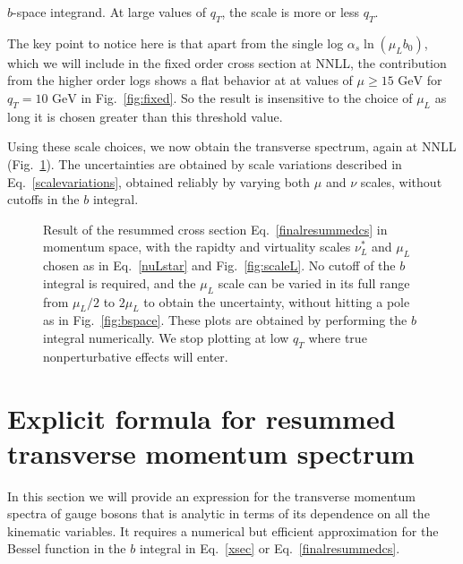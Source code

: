 \documentclass[a4,letterpaper,11pt]{article}
\newcommand{\eq}[1]{Eq.~\eqref{#1}}
\newcommand{\fig}[1]{Fig.~\ref{fig:#1}}
\begin{document}
$b$-space integrand. At large values of $q_T$, the scale is more or less $q_T$.




The key point to notice here is that apart from the single log $\alpha_s \ln(\mu_L b_0)$, which we will include in the fixed order cross section at NNLL, the contribution from the higher order logs shows a flat behavior at at values of $\mu \geq 15\text{ GeV}$ for $q_T= 10\text{ GeV}$  in \fig{fixed}. So the result is insensitive to the choice of $\mu_L$ as long it is chosen greater than this threshold value.


Using these scale choices, we now obtain the transverse spectrum, again at NNLL (\fig{NNLL}). The uncertainties are obtained by scale variations described in \eq{scalevariations}, obtained reliably by varying both $\mu$ and $\nu$ scales, without cutoffs in the $b$ integral.

\begin{figure}
\centerline{}
\vskip-0.2cm
\caption[1]{Result of the resummed cross section \eq{finalresummedcs} in momentum space, with the rapidty and virtuality scales $\nu_L^*$ and $\mu_L$ chosen as in \eq{nuLstar} and \fig{scaleL}. No cutoff of the $b$ integral is required, and the $\mu_L$ scale can be varied in its full range from $\mu_L/2$ to $2\mu_L$ to obtain the uncertainty, without hitting a pole as in \fig{bspace}. These plots are obtained by performing the $b$ integral numerically. We stop plotting at low $q_T$ where true nonperturbative effects will enter.}
\label{fig:NNLL} 
\end{figure}


\section{Explicit formula for resummed transverse momentum spectrum}
\label{sec:analytic}

In this section we will provide an expression for the transverse momentum spectra of gauge bosons that is analytic in terms of its dependence on all the kinematic variables. It requires a numerical but efficient approximation for the Bessel function in the $b$ integral in \eq{xsec} or \eq{finalresummedcs}. 
\end{document}
